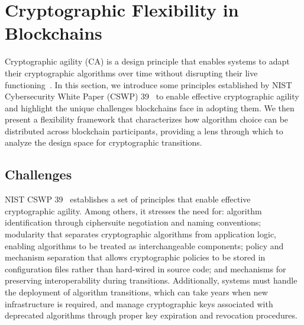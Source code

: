 \section{Cryptographic Flexibility in Blockchains}\label{sec:crypto-flexibility}

Cryptographic agility (CA) is a design principle that enables systems to adapt their cryptographic algorithms over time without disrupting their live functioning~\cite{NIST:BCC+25}. 
In this section, we introduce some principles established by NIST Cybersecurity White Paper (CSWP) 39~\cite{NIST:BCC+25} to enable effective cryptographic agility and highlight the unique challenges blockchains face in adopting them. 
We then present a flexibility framework that characterizes how algorithm choice can be distributed across blockchain participants, providing a lens through which to analyze the design space for cryptographic transitions.

\subsection{Challenges}\label{ss:blockchain-hurdles}

NIST CSWP 39~\cite{NIST:BCC+25} establishes a set of principles that enable effective cryptographic agility. 
Among others, it stresses the need for: algorithm identification through ciphersuite negotiation and naming conventions; modularity that separates cryptographic algorithms from application logic, enabling algorithms to be treated as interchangeable components; policy and mechanism separation that allows cryptographic policies to be stored in configuration files rather than hard-wired in source code; and mechanisms for preserving interoperability during transitions. 
Additionally, systems must handle the deployment of algorithm transitions, which can take years when new infrastructure is required, and manage cryptographic keys associated with deprecated algorithms through proper key expiration and revocation procedures.

